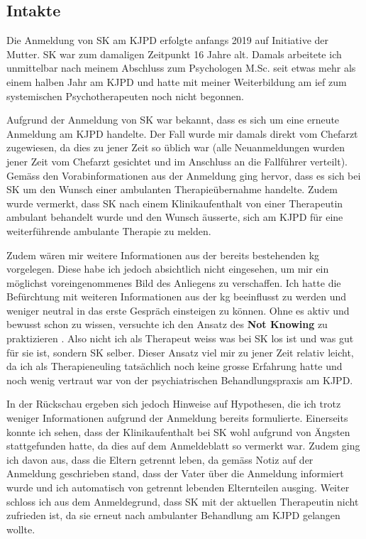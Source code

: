 \subsection{Intakte} 
Die Anmeldung von SK am KJPD erfolgte anfangs 2019 auf Initiative der Mutter. SK war zum damaligen Zeitpunkt 16 Jahre alt. Damals arbeitete ich unmittelbar nach meinem Abschluss zum Psychologen M.Sc. seit etwas mehr als einem halben Jahr am KJPD und hatte mit meiner Weiterbildung am \ac{ief} zum systemischen Psychotherapeuten noch nicht begonnen. 

Aufgrund der Anmeldung von SK war bekannt, dass es sich um eine erneute Anmeldung am KJPD handelte. Der Fall wurde mir damals direkt vom Chefarzt zugewiesen, da dies zu jener Zeit so üblich war (alle Neuanmeldungen wurden jener Zeit vom Chefarzt gesichtet und im Anschluss an die Fallführer verteilt). Gemäss den Vorabinformationen aus der Anmeldung ging hervor, dass es sich bei SK um den Wunsch einer ambulanten Therapieübernahme handelte. Zudem wurde vermerkt, dass SK nach einem Klinikaufenthalt von einer Therapeutin ambulant behandelt wurde und den Wunsch äusserte, sich am KJPD für eine weiterführende ambulante Therapie zu melden.

Zudem wären mir weitere Informationen aus der bereits bestehenden \ac{kg} vorgelegen. Diese habe ich jedoch absichtlich nicht eingesehen, um mir ein möglichst voreingenommenes Bild des Anliegens zu verschaffen. Ich hatte die Befürchtung mit weiteren Informationen aus der \ac{kg} beeinflusst zu werden und weniger neutral in das erste Gespräch einsteigen zu können. Ohne es aktiv und bewusst schon zu wissen, versuchte ich den Ansatz des \textbf{Not Knowing} zu praktizieren \cite{Anderson1992}. Also nicht ich als Therapeut weiss was bei SK los ist und was gut für sie ist, sondern SK selber. Dieser Ansatz viel mir zu jener Zeit relativ leicht, da ich als Therapieneuling tatsächlich noch keine grosse Erfahrung hatte und noch wenig vertraut war von der psychiatrischen Behandlungspraxis am KJPD. 

In der Rückschau ergeben sich jedoch Hinweise auf Hypothesen, die ich trotz weniger Informationen aufgrund der Anmeldung bereits formulierte. Einerseits konnte ich sehen, dass der Klinikaufenthalt bei SK wohl aufgrund von Ängsten stattgefunden hatte, da dies auf dem Anmeldeblatt so vermerkt war. Zudem ging ich davon aus, dass die Eltern getrennt leben, da gemäss Notiz auf der Anmeldung geschrieben stand, dass der Vater über die Anmeldung informiert wurde und ich automatisch von getrennt lebenden Elternteilen ausging. Weiter schloss ich aus dem Anmeldegrund, dass SK mit der aktuellen Therapeutin nicht zufrieden ist, da sie erneut nach ambulanter Behandlung am KJPD gelangen wollte. 

